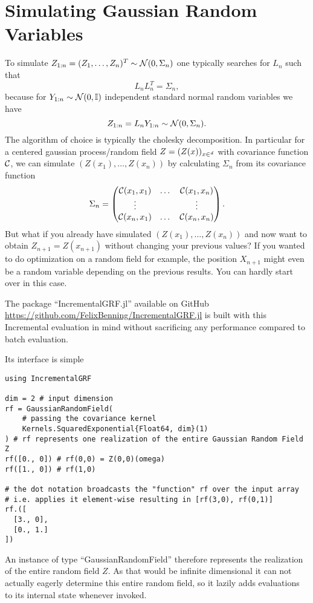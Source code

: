 \section{Simulating Gaussian Random Variables}

To simulate \(Z_{1:n} = (Z_1,\dots,Z_n)^T \sim \mathcal{N}(0, \Sigma_n)\) one typically
searches for \(L_n\) such that
\[
	L_n L_n^T = \Sigma_n,
\]
because for \(Y_{1:n}\sim\mathcal{N}(0,\mathbb{I})\) independent standard normal
random variables we have
\[
	Z_{1:n} = L_n Y_{1:n} \sim \mathcal{N}(0, \Sigma_n).
\]
The algorithm of choice is typically the cholesky decomposition.
In particular for a centered gaussian process/random field 
\(Z=(Z(x))_{x\in\real^\dimension}\) with covariance function \(\mathcal{C}\),
we can simulate \((Z(x_1),\dots, Z(x_n))\) by calculating \(\Sigma_n\) from its
covariance function
\[
	\Sigma_n = \begin{pmatrix}
		\mathcal{C}(x_1, x_1) &\dots &\mathcal{C}(x_1, x_n)\\
		\vdots &  & \vdots \\
		\mathcal{C}(x_n, x_1) &\dots &\mathcal{C}(x_n, x_n)
	\end{pmatrix}.
\]
But what if you already have simulated \((Z(x_1),\dots,Z(x_n))\) and now want
to obtain \(Z_{n+1} = Z(x_{n+1})\) without changing your previous values? If you wanted
to do optimization on a random field for example, the position \(X_{n+1}\) might
even be a random variable depending on the previous results. You can hardly
start over in this case.

The package ``IncrementalGRF.jl'' available on GitHub
\url{https://github.com/FelixBenning/IncrementalGRF.jl} is built with this
Incremental evaluation in mind without sacrificing any performance compared to
batch evaluation.

Its interface is simple

\begin{verbatim}
using IncrementalGRF

dim = 2 # input dimension
rf = GaussianRandomField(
	# passing the covariance kernel
	Kernels.SquaredExponential{Float64, dim}(1)
) # rf represents one realization of the entire Gaussian Random Field Z
rf([0., 0]) # rf(0,0) = Z(0,0)(omega)
rf([1., 0]) # rf(1,0)

# the dot notation broadcasts the "function" rf over the input array
# i.e. applies it element-wise resulting in [rf(3,0), rf(0,1)]
rf.([
  [3., 0],
  [0., 1.]
])
\end{verbatim}
An instance of type ``GaussianRandomField'' therefore represents the realization
of the entire random field \(Z\). As that would be infinite dimensional it can
not actually eagerly determine this entire random field, so it lazily
adds evaluations to its internal state whenever invoked.

